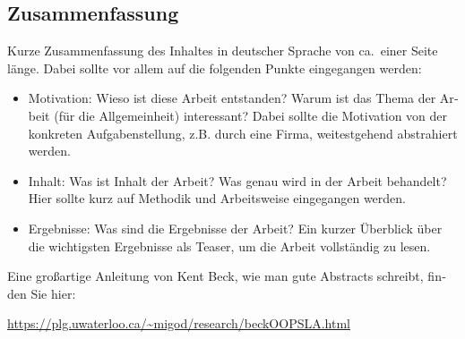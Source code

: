 \begin{otherlanguage}{ngerman}
	\chapter*{Zusammenfassung}
	Kurze Zusammenfassung des Inhaltes in deutscher Sprache von ca.\ einer Seite länge. Dabei sollte vor allem auf die folgenden Punkte eingegangen werden:
	\begin{itemize}
	  \item Motivation: Wieso ist diese Arbeit entstanden? Warum ist das Thema der Arbeit (für die Allgemeinheit) interessant? Dabei sollte die Motivation von der konkreten Aufgabenstellung, z.B. durch eine Firma, weitestgehend abstrahiert werden. 
          \item Inhalt: Was ist Inhalt der Arbeit? Was genau wird in der Arbeit behandelt? Hier sollte kurz auf Methodik und Arbeitsweise eingegangen werden.
          \item Ergebnisse: Was sind die Ergebnisse der Arbeit? Ein kurzer Überblick über die wichtigsten Ergebnisse als Teaser, um die Arbeit vollständig zu lesen.
	\end{itemize}
	\medskip

	\noindent
	Eine großartige Anleitung von Kent Beck, wie man gute Abstracts schreibt, finden Sie hier:
	\begin{center}
                \url{https://plg.uwaterloo.ca/~migod/research/beckOOPSLA.html}
        \end{center}

\end{otherlanguage}
